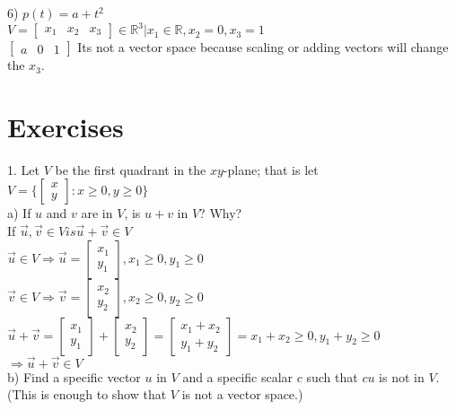 \documentclass[a4paper]{article}
\begin{document}
6) $p(t) = a + t^2$\\
$V = \begin{bmatrix}
x_1&x_2&x_3
\end{bmatrix} \in \mathbb{R}^3 | x_1 \in \mathbb{R}, x_2 = 0, x_3 = 1$\\
$\begin{bmatrix}
a&0&1
\end{bmatrix}$
Its not a vector space because scaling or adding vectors will change the $x_3$.\\

\section{Exercises}

1. Let $V$ be the first quadrant in the $xy$-plane; that is let $V = \{
\begin{bmatrix}
x\\
y
\end{bmatrix} : x \geq 0, y \geq 0 \} $\\
a) If $u$ and $v$ are in $V$, is $u+v$ in $V$? Why?\\
If $\vec{u}, \vec{v} \in V is \vec{u} + \vec{v} \in V$\\
$\vec{u} \in V \Rightarrow \vec{u} = \begin{bmatrix}
x_1\\
y_1
\end{bmatrix}, x_1 \geq 0, y_1 \geq 0$\\
$\vec{v} \in V \Rightarrow \vec{v} = \begin{bmatrix}
x_2\\
y_2
\end{bmatrix}, x_2 \geq 0, y_2 \geq 0$\\
$\vec{u} + \vec{v} = \begin{bmatrix}
x_1\\
y_1
\end{bmatrix} + \begin{bmatrix}
x_2\\
y_2
\end{bmatrix} = \begin{bmatrix}
x_1 + x_2\\
y_1 + y_2
\end{bmatrix} = x_1 + x_2 \geq 0, y_1 + y_2 \geq 0$\\
$\Rightarrow \vec{u} + \vec{v} \in V$\\
b) Find a specific vector $u$ in $V$ and a specific scalar $c$ such that $cu$ is not in $V$. (This is enough to show that $V$ is not a vector space.)\\
\end{document}
